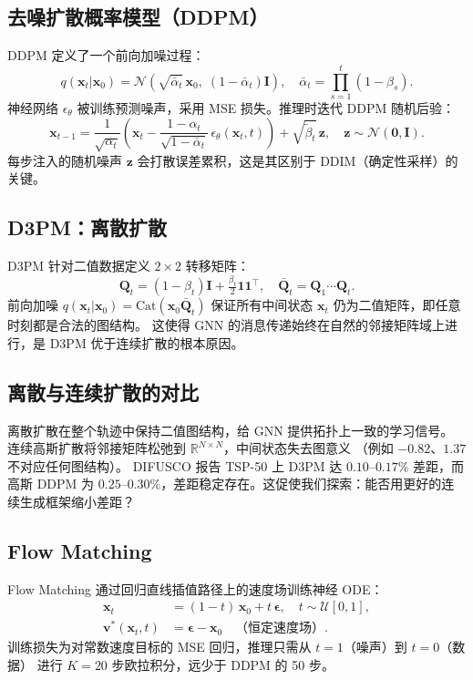\documentclass[11pt,a4paper]{article}
\begin{document}
\subsection{去噪扩散概率模型（DDPM）}
DDPM \citep{ho2020ddpm} 定义了一个前向加噪过程：
\begin{equation}
  q(\mathbf{x}_t | \mathbf{x}_0)
  = \mathcal{N}\!\left(\sqrt{\bar\alpha_t}\,\mathbf{x}_0,\;(1-\bar\alpha_t)\mathbf{I}\right),
  \quad \bar\alpha_t = \prod_{s=1}^t(1-\beta_s).
\end{equation}
神经网络 $\epsilon_\theta$ 被训练预测噪声，采用 MSE 损失。推理时迭代 DDPM 随机后验：
\begin{equation}
  \mathbf{x}_{t-1}
  = \frac{1}{\sqrt{\alpha_t}}\!\left(\mathbf{x}_t
    - \frac{1-\alpha_t}{\sqrt{1-\bar\alpha_t}}\,\epsilon_\theta(\mathbf{x}_t,t)\right)
    + \sqrt{\tilde\beta_t}\,\mathbf{z},
  \quad \mathbf{z}\sim\mathcal{N}(\mathbf{0},\mathbf{I}).
\end{equation}
每步注入的随机噪声 $\mathbf{z}$ 会打散误差累积，这是其区别于 DDIM（确定性采样）的关键。

\subsection{D3PM：离散扩散}
\label{sec:d3pm_bg}
D3PM \citep{austin2021d3pm} 针对二值数据定义 $2\times 2$ 转移矩阵：
\begin{equation}
  \mathbf{Q}_t = (1-\beta_t)\mathbf{I} + \tfrac{\beta_t}{2}\mathbf{1}\mathbf{1}^\top,
  \quad \bar{\mathbf{Q}}_t = \mathbf{Q}_1\cdots\mathbf{Q}_t.
\end{equation}
前向加噪 $q(\mathbf{x}_t|\mathbf{x}_0) = \text{Cat}(\mathbf{x}_0\bar{\mathbf{Q}}_t)$
保证所有中间状态 $\mathbf{x}_t$ 仍为二值矩阵，即任意时刻都是合法的图结构。
这使得 GNN 的消息传递始终在自然的邻接矩阵域上进行，是 D3PM 优于连续扩散的根本原因。

\subsection{离散与连续扩散的对比}
离散扩散在整个轨迹中保持二值图结构，给 GNN 提供拓扑上一致的学习信号。
连续高斯扩散将邻接矩阵松弛到 $\mathbb{R}^{N\times N}$，中间状态失去图意义
（例如 $-0.82$、$1.37$ 不对应任何图结构）。
DIFUSCO 报告 TSP-50 上 D3PM 达 $0.10$--$0.17\%$ 差距，而高斯 DDPM 为
$0.25$--$0.30\%$，差距稳定存在。这促使我们探索：能否用更好的连续生成框架缩小差距？

\subsection{Flow Matching}
\label{sec:fm_bg}
Flow Matching \citep{lipman2022flow} 通过回归直线插值路径上的速度场训练神经 ODE：
\begin{align}
  \mathbf{x}_t &= (1-t)\,\mathbf{x}_0 + t\,\boldsymbol\epsilon,
    \quad t\sim\mathcal{U}[0,1], \\
  \mathbf{v}^*(\mathbf{x}_t,t) &= \boldsymbol\epsilon - \mathbf{x}_0 \quad \text{（恒定速度场）}.
\end{align}
训练损失为对常数速度目标的 MSE 回归，推理只需从 $t=1$（噪声）到 $t=0$（数据）
进行 $K=20$ 步欧拉积分，远少于 DDPM 的 50 步。
\end{document}
